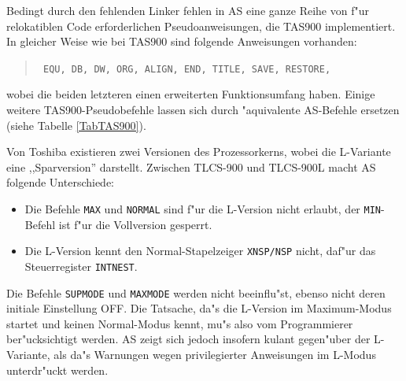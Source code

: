 \documentclass[12pt,a4paper,twoside]{report}
\newcommand{\tty}[1]{{\tt #1}}
\newcommand{\asname}{AS}
\begin{document}
Bedingt durch den fehlenden Linker fehlen in \asname{} eine ganze Reihe von f"ur
relokatiblen Code erforderlichen Pseudoanweisungen, die TAS900 implementiert.
In gleicher Weise wie bei TAS900 sind folgende Anweisungen vorhanden:
\begin{quote}{\tt
EQU, DB, DW, ORG, ALIGN, END, TITLE, SAVE, RESTORE,
}\end{quote}
wobei die beiden letzteren einen erweiterten Funktionsumfang haben.
Einige weitere TAS900-Pseudobefehle lassen sich durch "aquivalente \asname{}-Befehle
ersetzen (siehe Tabelle \ref{TabTAS900}).
\par
Von Toshiba existieren zwei Versionen des Prozessorkerns, wobei die
L-Variante eine ,,Sparversion'' darstellt.  Zwischen TLCS-900 und TLCS-900L
macht \asname{} folgende Unterschiede:
\begin{itemize}
\item{Die Befehle \tty{MAX} und \tty{NORMAL} sind f"ur die L-Version
      nicht erlaubt, der \tty{MIN}-Befehl ist f"ur die Vollversion
      gesperrt.}
\item{Die L-Version kennt den Normal-Stapelzeiger \tty{XNSP/NSP} nicht,
      daf"ur das Steuerregister \tty{INTNEST}.}
\end{itemize}
Die Befehle \tty{SUPMODE} und \tty{MAXMODE} werden nicht beeinflu"st,
ebenso nicht deren ini\-tiale Einstellung OFF.  Die Tatsache, da"s die
L-Version im Maximum-Modus startet und keinen Normal-Modus kennt, mu"s
also vom Programmierer ber"ucksichtigt werden.  \asname{} zeigt sich jedoch
insofern kulant gegen"uber der L-Variante, als da"s Warnungen wegen
privilegierter Anweisungen im L-Modus unterdr"uckt werden.
\end{document}
